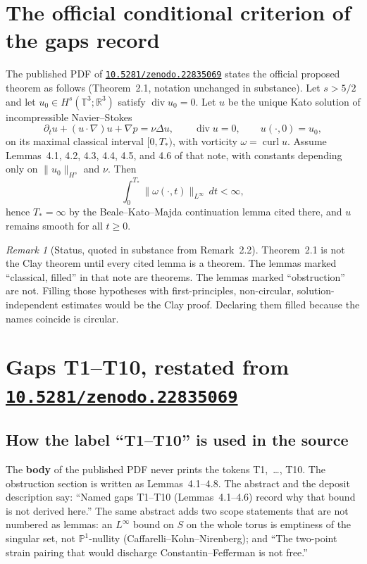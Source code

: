 \documentclass[11pt]{article}
\theoremstyle{plain}
\theoremstyle{definition}
\theoremstyle{remark}
\newtheorem{remark}[theorem]{Remark}
\newcommand{\Tthree}{\mathbb{T}^{3}}
\newcommand{\R}{\mathbb{R}}
\newcommand{\doi}[1]{\href{https://doi.org/#1}{\texttt{#1}}}
\begin{document}
\section{The official conditional criterion of the gaps record}

The published PDF of \doi{10.5281/zenodo.22835069} states the official proposed theorem as follows (Theorem~2.1, notation unchanged in substance). Let \(s>5/2\) and let \(u_{0}\in H^{s}(\Tthree;\R^{3})\) satisfy \(\operatorname{div}u_{0}=0\). Let \(u\) be the unique Kato solution of incompressible Navier--Stokes
\[
\partial_{t}u+(u\cdot\nabla)u+\nabla p=\nu\Delta u,\qquad
\operatorname{div}u=0,\qquad u(\cdot,0)=u_{0},
\]
on its maximal classical interval \([0,T_{\ast})\), with vorticity \(\omega=\operatorname{curl}u\). Assume Lemmas~4.1, 4.2, 4.3, 4.4, 4.5, and 4.6 of that note, with constants depending only on \(\|u_{0}\|_{H^{s}}\) and \(\nu\). Then
\[
\int_{0}^{T_{\ast}}\|\omega(\cdot,t)\|_{L^{\infty}}\,dt<\infty,
\]
hence \(T_{\ast}=\infty\) by the Beale--Kato--Majda continuation lemma cited there, and \(u\) remains smooth for all \(t\ge 0\).

\begin{remark}[Status, quoted in substance from Remark~2.2]
Theorem~2.1 is not the Clay theorem until every cited lemma is a theorem. The lemmas marked ``classical, filled'' in that note are theorems. The lemmas marked ``obstruction'' are not. Filling those hypotheses with first-principles, non-circular, solution-independent estimates would be the Clay proof. Declaring them filled because the names coincide is circular.
\end{remark}

\section{Gaps T1--T10, restated from \doi{10.5281/zenodo.22835069}}

\subsection{How the label ``T1--T10'' is used in the source}

The \textbf{body} of the published PDF never prints the tokens T1,~\dots, T10. The obstruction section is written as Lemmas~4.1--4.8. The abstract and the deposit description say: ``Named gaps T1--T10 (Lemmas~4.1--4.6) record why that bound is not derived here.'' The same abstract adds two scope statements that are not numbered as lemmas: an \(L^{\infty}\) bound on \(S\) on the whole torus is emptiness of the singular set, not \(\mathbb{P}^{1}\)-nullity (Caffarelli--Kohn--Nirenberg); and ``The two-point strain pairing that would discharge Constantin--Fefferman is not free.''
\end{document}
